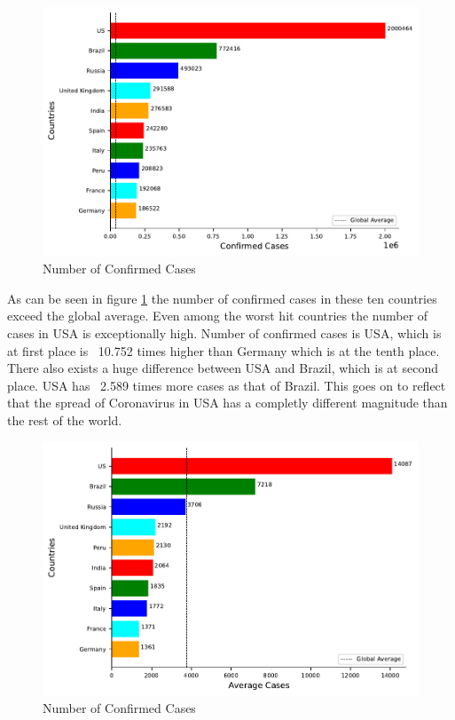\documentclass[12pt, twosided]{report}  %
\begin{document}
\begin{figure}[H]
\centering
	\includegraphics[width=0.5\linewidth]{./images/plot-1.pdf}
	\caption{Number of Confirmed Cases}
	\label{plot_confirmedcases}
\end{figure}

As can be seen in figure \ref{plot_confirmedcases} the number of confirmed cases in these ten countries exceed the global average. Even among the worst hit countries the number of cases in USA is exceptionally high. Number of confirmed cases is USA, which is at first place is ~10.752 times higher than Germany which is at the tenth place. There also exists a huge difference between USA and Brazil, which is at second place. USA has ~2.589 times more cases as that of Brazil. This goes on to reflect that the spread of Coronavirus in USA has a completly different magnitude than the rest of the world. 

\begin{figure}[H]
	\centering
	\includegraphics[width=0.5\linewidth]{./images/plot-2.pdf}
	\caption{Number of Confirmed Cases}
	\label{plot_averagecases}
\end{figure}
\end{document}
